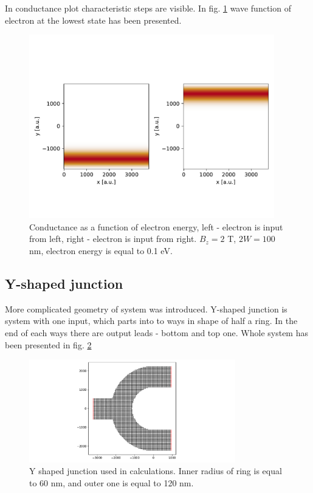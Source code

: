 \documentclass[12pt, a4paper]{article}
\begin{document}
In conductance plot characteristic steps are visible.
In fig. \ref{fig:ex2_wavefunction} wave function of electron at the lowest state has been presented.

\begin{figure}[H]
    \begin{center}
        \includegraphics[width=0.95\textwidth]{../plots/ex2_wavefunction.pdf}
    \end{center}
    \caption{Conductance as a function of electron energy, left - electron is input from left, right - electron is input from right. $B_z = 2$ T, $2W = 100$ nm, electron energy is equal to 0.1 eV.}
    \label{fig:ex2_wavefunction}
\end{figure}

\subsection*{Y-shaped junction}

More complicated geometry of system was introduced.
Y-shaped junction is system with one input, which parts into to ways in shape of half a ring.
In the end of each ways there are output leads - bottom and top one.
Whole system has been presented in fig. \ref{fig:ex3_system}

\begin{figure}[H]
    \begin{center}
        \includegraphics[width=0.8\textwidth]{../plots/kwant_ex3_ring_system.pdf}
    \end{center}
    \caption{Y shaped junction used in calculations. Inner radius of ring is equal to 60 nm, and outer one is equal to 120 nm.}\label{fig:ex3_system}
\end{figure}
\end{document}
